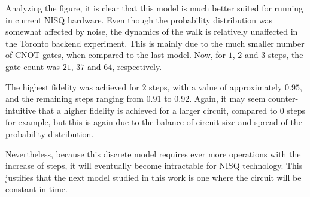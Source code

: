 \documentclass[../../dissertation.tex]{subfiles}
\begin{document}
Analyzing the figure, it is clear that this model is much better suited for
running in current NISQ hardware. Even though the probability distribution
was somewhat affected by noise, the dynamics of the walk is relatively
unaffected in the Toronto backend experiment. This is mainly due to the much smaller number of CNOT gates, when compared to the last model. Now, for $1$, $2$ and $3$ steps, the gate count was $21$, $37$ and $64$, respectively.
\par The highest fidelity was
achieved for $2$ steps, with a value of approximately $0.95$, and the remaining
steps ranging from $0.91$ to $0.92$.  Again, it may seem counter-intuitive that
a higher fidelity is achieved for a larger circuit, compared to $0$ steps for
example, but this is again due to the balance of circuit size and spread of the
probability distribution.\par

Nevertheless, because this discrete model requires ever more operations with
the increase of steps, it will eventually become intractable for NISQ
technology. This justifies that the next model studied in this work is one where
the circuit will be constant in time.
\end{document}
